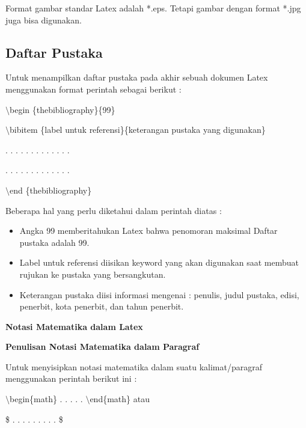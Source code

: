 Format gambar standar Latex adalah *.eps. Tetapi gambar dengan format *.jpg juga bisa digunakan.\par \vspace{12pt}

\subsection {Daftar Pustaka}\par \vspace{12pt}

Untuk menampilkan daftar pustaka pada akhir sebuah dokumen Latex menggunakan format perintah sebagai berikut :\par \vspace{12pt}

$\setminus$begin \{thebibliography\}\{99\}
\par \vspace{12pt}
$\setminus$bibitem \{label untuk referensi\}\{keterangan pustaka yang digunakan\}
\par \vspace{12pt}
. . . . . . . . . . . . .

. . . . . . . . . . . . .
\par \vspace{12pt}
$\setminus$end \{thebibliography\}
\par \vspace{12pt}


Beberapa hal yang perlu diketahui dalam perintah diatas :

\begin{itemize}
\item Angka 99 memberitahukan Latex bahwa penomoran maksimal Daftar pustaka adalah 99.
\item Label untuk referensi diisikan keyword yang akan digunakan saat membuat rujukan ke pustaka yang bersangkutan.
\item Keterangan pustaka diisi informasi mengenai : penulis, judul pustaka, edisi, penerbit, kota penerbit, dan tahun penerbit.
\end{itemize}


\textbf{Notasi Matematika dalam Latex}\par \vspace{12pt}

\textbf{Penulisan Notasi Matematika dalam Paragraf}\par \vspace{12pt}

Untuk menyisipkan notasi matematika dalam suatu kalimat/paragraf menggunakan perintah berikut ini :
\par \vspace{12pt}
$\setminus$begin\{math\} . . . . . $\setminus$end\{math\} atau
\par \vspace{12pt}
\$ . . . . . . . . . \$
\par \vspace{12pt}


